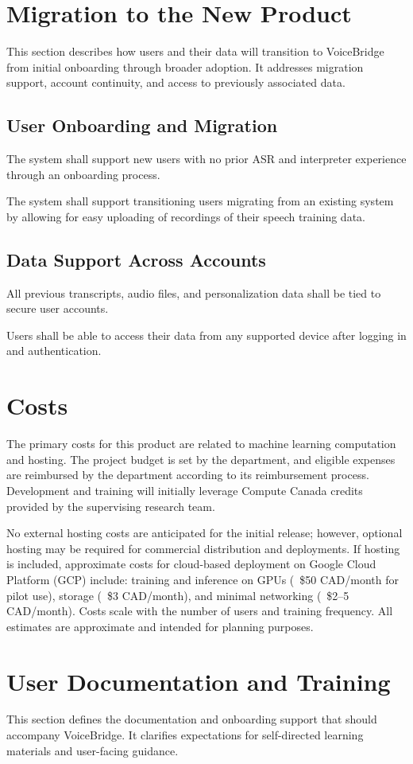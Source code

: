 \documentclass[11pt]{article}
\begin{document}
\section{Migration to the New Product}
This section describes how users and their data will transition to VoiceBridge from initial onboarding through broader adoption. It addresses migration support, account continuity, and access to previously associated data.

\subsection{User Onboarding and Migration}
The system shall support new users with no prior ASR and interpreter experience through an onboarding process. 

The system shall support transitioning users migrating from an existing system by allowing for easy uploading of recordings of their speech training data.

\subsection{Data Support Across Accounts}
All previous transcripts, audio files, and personalization data shall be tied to secure user accounts.

Users shall be able to access their data from any supported device after logging in and authentication.

\section{Costs}
The primary costs for this product are related to machine learning computation and hosting. The project budget is set by the department, and eligible expenses are reimbursed by the department according to its reimbursement process. Development and training will initially leverage Compute Canada credits provided by the supervising research team.

No external hosting costs are anticipated for the initial release; however, optional hosting may be required for commercial distribution and deployments. If hosting is included, approximate costs for cloud-based deployment on Google Cloud Platform (GCP) include: training and inference on GPUs (~\$50 CAD/month for pilot use), storage (~\$3 CAD/month), and minimal networking (~\$2–5 CAD/month). Costs scale with the number of users and training frequency. All estimates are approximate and intended for planning purposes.
\section{User Documentation and Training}
This section defines the documentation and onboarding support that should accompany VoiceBridge. It clarifies expectations for self-directed learning materials and user-facing guidance.
\end{document}
